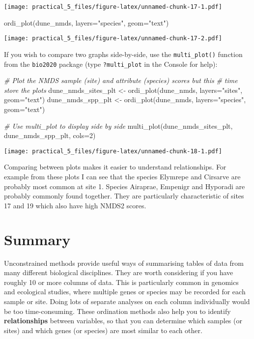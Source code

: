 \documentclass[
]{article}
\newenvironment{Shaded}{\begin{snugshade}}{\end{snugshade}}
\newcommand{\AttributeTok}[1]{\textcolor[rgb]{0.77,0.63,0.00}{#1}}
\newcommand{\CommentTok}[1]{\textcolor[rgb]{0.56,0.35,0.01}{\textit{#1}}}
\newcommand{\DecValTok}[1]{\textcolor[rgb]{0.00,0.00,0.81}{#1}}
\newcommand{\FunctionTok}[1]{\textcolor[rgb]{0.00,0.00,0.00}{#1}}
\newcommand{\NormalTok}[1]{#1}
\newcommand{\OtherTok}[1]{\textcolor[rgb]{0.56,0.35,0.01}{#1}}
\newcommand{\StringTok}[1]{\textcolor[rgb]{0.31,0.60,0.02}{#1}}
\begin{document}
\texttt{[image: practical\_5\_files/figure-latex/unnamed-chunk-17-1.pdf]}

\begin{Shaded}
\begin{Highlighting}[]
\FunctionTok{ordi\_plot}\NormalTok{(dune\_nmds, }\AttributeTok{layers=}\StringTok{"species"}\NormalTok{, }\AttributeTok{geom=}\StringTok{"text"}\NormalTok{)}
\end{Highlighting}
\end{Shaded}

\texttt{[image: practical\_5\_files/figure-latex/unnamed-chunk-17-2.pdf]}

If you wish to compare two graphs side-by-side, use the
\texttt{multi\_plot()} function from the \texttt{bio2020} package (type
\texttt{?multi\_plot} in the Console for help):

\begin{Shaded}
\begin{Highlighting}[]
\CommentTok{\# Plot the NMDS sample (site) and attribute (species) scores but this}
\CommentTok{\# time store the plots}
\NormalTok{dune\_nmds\_sites\_plt }\OtherTok{\textless{}{-}} \FunctionTok{ordi\_plot}\NormalTok{(dune\_nmds, }\AttributeTok{layers=}\StringTok{"sites"}\NormalTok{, }\AttributeTok{geom=}\StringTok{"text"}\NormalTok{)}
\NormalTok{dune\_nmds\_spp\_plt   }\OtherTok{\textless{}{-}} \FunctionTok{ordi\_plot}\NormalTok{(dune\_nmds, }\AttributeTok{layers=}\StringTok{"species"}\NormalTok{, }\AttributeTok{geom=}\StringTok{"text"}\NormalTok{)}

\CommentTok{\# Use multi\_plot to display side by side}
\FunctionTok{multi\_plot}\NormalTok{(dune\_nmds\_sites\_plt, dune\_nmds\_spp\_plt, }\AttributeTok{cols=}\DecValTok{2}\NormalTok{)}
\end{Highlighting}
\end{Shaded}

\texttt{[image: practical\_5\_files/figure-latex/unnamed-chunk-18-1.pdf]}

Comparing between plots makes it easier to understand relationships. For
example from these plots I can see that the species Elymrepe and
Cirsarve are probably most common at site 1. Species Airaprae, Empenigr
and Hyporadi are probably commonly found together. They are particularly
characteristic of sites 17 and 19 which also have high NMDS2 scores.

\hypertarget{summary}{%
\section{Summary}\label{summary}}

Unconstrained methods provide useful ways of summarising tables of data
from many different biological disciplines. They are worth considering
if you have roughly 10 or more columns of data. This is particularly
common in genomics and ecological studies, where multiple genes or
species may be recorded for each sample or site. Doing lots of separate
analyses on each column individually would be too time-consuming. These
ordination methods also help you to identify \textbf{relationships}
between variables, so that you can determine which samples (or sites)
and which genes (or species) are most similar to each other.
\end{document}
